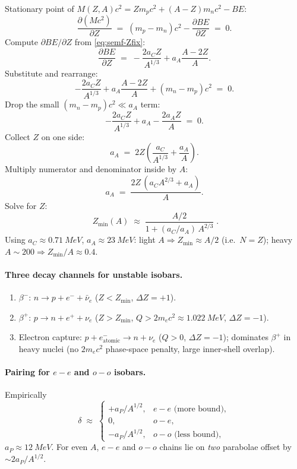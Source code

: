 \documentclass[11pt]{article}
\newcommand{\pd}[2]{\frac{\partial #1}{\partial #2}}
\begin{document}
Stationary point of $M(Z,A)c^{2}=Zm_{p}c^{2}+(A-Z)m_{n}c^{2}-BE$:
\[
\pd{(Mc^{2})}{Z}\;=\;(m_{p}-m_{n})c^{2}-\pd{BE}{Z}\;=\;0.
\]
Compute $\partial BE/\partial Z$ from \eqref{eq:semf-Zfix}:
\[
\pd{BE}{Z}\;=\;-\frac{2a_{C}Z}{A^{1/3}}+a_{A}\frac{A-2Z}{A}.
\]
Substitute and rearrange:
\[
-\frac{2a_{C}Z}{A^{1/3}}+a_{A}\frac{A-2Z}{A}+(m_{n}-m_{p})c^{2}\;=\;0.
\]
Drop the small $(m_{n}-m_{p})c^{2}\!\ll\!a_{A}$ term:
\[
-\frac{2a_{C}Z}{A^{1/3}}+a_{A}-\frac{2a_{A}Z}{A}\;=\;0.
\]
Collect $Z$ on one side:
\[
a_{A}\;=\;2Z\!\left(\frac{a_{C}}{A^{1/3}}+\frac{a_{A}}{A}\right).
\]
Multiply numerator and denominator inside by $A$:
\[
a_{A}\;=\;\frac{2Z\,(a_{C}A^{2/3}+a_{A})}{A}.
\]
Solve for $Z$:
\begin{equation}
\boxed{\;Z_{\min}(A)\;\approx\;\frac{A/2}{1+(a_{C}/a_{A})\,A^{2/3}}\;.}
\label{eq:Zstab}
\end{equation}
Using $a_{C}\approx\SI{0.71}{MeV}$, $a_{A}\approx\SI{23}{MeV}$: light $A\Rightarrow Z_{\min}\approx A/2$ (i.e.\ $N=Z$); heavy $A\sim 200\Rightarrow Z_{\min}/A\approx 0.4$.

\paragraph{Three decay channels for unstable isobars.}
\begin{enumerate}
\item $\beta^{-}$: $n\to p+e^{-}+\bar\nu_{e}$ ($Z<Z_{\min}$, $\Delta Z=+1$).
\item $\beta^{+}$: $p\to n+e^{+}+\nu_{e}$ ($Z>Z_{\min}$, $Q>2m_{e}c^{2}\approx\SI{1.022}{MeV}$, $\Delta Z=-1$).
\item Electron capture: $p+e^{-}_\text{atomic}\to n+\nu_{e}$ ($Q>0$, $\Delta Z=-1$); dominates $\beta^{+}$ in heavy nuclei (no $2m_{e}c^{2}$ phase-space penalty, large inner-shell overlap).
\end{enumerate}

\paragraph{Pairing for $e\!-\!e$ and $o\!-\!o$ isobars.} Empirically
\begin{equation}
\delta\;\approx\;\begin{cases}+a_{P}/A^{1/2},& e\!-\!e\text{ (more bound)},\\ 0,& o\!-\!e,\\ -a_{P}/A^{1/2},& o\!-\!o\text{ (less bound)},\end{cases}
\label{eq:pairing}
\end{equation}
$a_{P}\approx\SI{12}{MeV}$. For even $A$, $e\!-\!e$ and $o\!-\!o$ chains lie on \emph{two} parabolae offset by $\sim 2a_{P}/A^{1/2}$.
\end{document}
